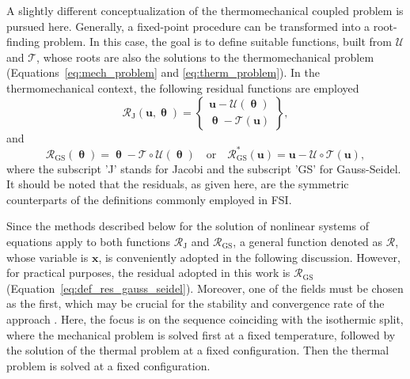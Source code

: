 A slightly different conceptualization of the thermomechanical coupled problem is pursued here.
Generally, a fixed-point procedure can be transformed into a root-finding problem.
In this case, the goal is to define suitable functions, built from \(\bm{\mathcal{U}}\) and \(\bm{\mathcal{T}}\), whose roots are also the solutions to the thermomechanical problem (Equations~\eqref{eq:mech_problem} and \eqref{eq:therm_problem}).
In the thermomechanical context, the following residual functions  are employed
\begin{equation} \label{eq:def_res_jacobi}
  \bm{\mathcal{R}}_\text{J}(\mathbf{u}, \bm{\uptheta}) =
  \left\{\begin{array}{c}
           \mathbf{u} - \bm{\mathcal{U}}(\bm{\uptheta})\\
           \bm{\uptheta} - \bm{\mathcal{T}}(\mathbf{u})
         \end{array}\right\},
     \end{equation}
     and
     \begin{equation} \label{eq:def_res_gauss_seidel}
       \bm{\mathcal{R}}_\text{GS}(\bm{\uptheta}) =
       \bm{\uptheta} - \bm{\mathcal{T}}\circ \bm{\mathcal{U}}(\bm{\uptheta}) \quad \text{or} \quad \bm{\mathcal{R}}^*_\text{GS}(\mathbf{u}) =
       \mathbf{u} - \bm{\mathcal{U}}\circ \bm{\mathcal{T}}(\mathbf{u}),
     \end{equation}
     where the subscript 'J' stands for Jacobi and the subscript 'GS' for Gauss-Seidel.
     It should be noted that the residuals, as given here, are the symmetric counterparts of the definitions commonly employed in FSI.

     Since the methods described below for the solution of nonlinear systems of equations apply to both functions \(\bm{\mathcal{R}}_\mathrm{J}\) and \(\bm{\mathcal{R}}_\mathrm{GS}\), a general function denoted as \(\bm{\mathcal{R}}\), whose variable is \(\mathbf{x}\), is conveniently adopted in the following discussion.
     However, for practical purposes, the residual adopted in this work is \(\bm{\mathcal{R}}_\text{GS}\) (Equation~\eqref{eq:def_res_gauss_seidel}).
     Moreover, one of the fields must be chosen as the first, which may be crucial for the stability and convergence rate of the approach \citep{joosten_analysis_2009}.
     Here, the focus is on the sequence coinciding with the isothermic split, where the mechanical problem is solved first at a fixed temperature, followed by the solution of the thermal problem at a fixed configuration.
     Then the thermal problem is solved at a fixed configuration.

